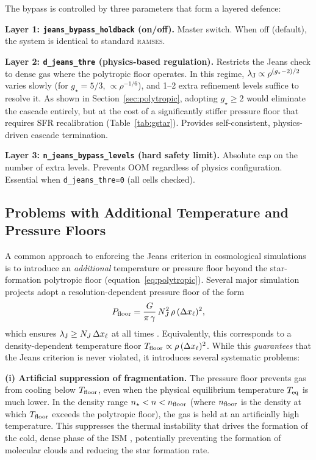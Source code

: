 \documentclass[fleqn,usenatbib]{mnras}
\newcommand{\lJ}{\lambda_{\rm J}}
\newcommand{\nstar}{n_\star}
\newcommand{\gstar}{g_\star}
\newcommand{\dx}{\Delta x}
\newcommand{\ramses}{\textsc{ramses}}
\newcommand{\code}[1]{\texttt{#1}}
\begin{document}
The bypass is controlled by three parameters that form a layered
defence:

\textbf{Layer 1: \code{jeans\_bypass\_holdback} (on/off).}
Master switch.  When off (default), the system is identical to
standard \ramses.

\textbf{Layer 2: \code{d\_jeans\_thre} (physics-based regulation).}
Restricts the Jeans check to dense gas where the polytropic floor
operates.  In this regime, $\lJ \propto \rho^{(\gstar-2)/2}$ varies
slowly (for $\gstar = 5/3$, $\propto \rho^{-1/6}$), and 1--2 extra
refinement levels suffice to resolve it.  As shown in
Section~\ref{sec:polytropic}, adopting $\gstar \ge 2$ would eliminate
the cascade entirely, but at the cost of a significantly stiffer
pressure floor that requires SFR recalibration
(Table~\ref{tab:gstar}).  Provides self-consistent, physics-driven
cascade termination.

\textbf{Layer 3: \code{n\_jeans\_bypass\_levels} (hard safety limit).}
Absolute cap on the number of extra levels.  Prevents OOM regardless
of physics configuration.  Essential when
\code{d\_jeans\_thre=0} (all cells checked).


\subsection{Problems with Additional Temperature and Pressure Floors}
\label{sec:pfloor}

A common approach to enforcing the Jeans criterion in cosmological
simulations is to introduce an \emph{additional} temperature or
pressure floor beyond the star-formation polytropic floor
(equation~\ref{eq:polytropic}).  Several major simulation projects
adopt a resolution-dependent pressure floor of the form
\begin{equation}
  P_{\rm floor} = \frac{G}{\pi\,\gamma}\,
  N_J^2\,\rho\,(\dx_\ell)^2,
  \label{eq:pfloor}
\end{equation}
which ensures $\lJ \ge N_J\,\dx_\ell$ at all times
\citep[e.g.][]{Schaye2015, Hopkins2018}.  Equivalently, this
corresponds to a density-dependent temperature floor
$T_{\rm floor} \propto \rho\,(\dx_\ell)^2$.  While this
\emph{guarantees} that the Jeans criterion is never violated, it
introduces several systematic problems:

\textbf{(i) Artificial suppression of fragmentation.}
The pressure floor prevents gas from cooling below $T_{\rm floor}$,
even when the physical equilibrium temperature $T_{\rm eq}$ is much
lower.  In the density range $\nstar < n < n_{\rm floor}$ (where
$n_{\rm floor}$ is the density at which $T_{\rm floor}$ exceeds the
polytropic floor), the gas is held at an artificially high
temperature.  This suppresses the thermal instability that drives
the formation of the cold, dense phase of the ISM
\citep{Sutherland1993, Wiersma2009}, potentially preventing the
formation of molecular clouds and reducing the star formation rate.
\end{document}
